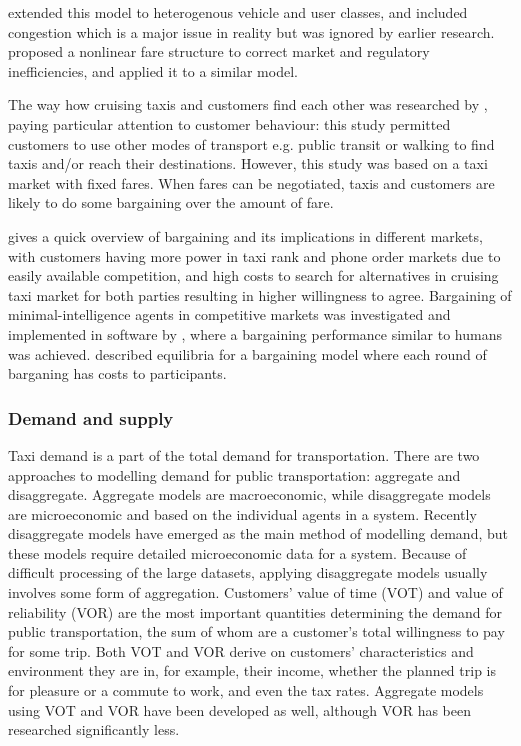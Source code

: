 \textcite{Wong2008taxi+modeling} extended this model to heterogenous vehicle
and user classes, and included congestion which is a major issue in reality but
was ignored by earlier research. \textcite{Yang2010taxi+nonlinear} proposed a
nonlinear fare structure to correct market and regulatory inefficiencies, and
applied it to a similar model.

The way how cruising taxis and customers find each other was researched by
\textcite{Yang2010taxi+equilibria}, paying particular attention to customer
behaviour: this study permitted customers to use other modes of transport e.g.
public transit or walking to find taxis and/or reach their destinations.
However, this study was based on a taxi market with fixed fares. When fares can
be negotiated, taxis and customers are likely to do some bargaining over the
amount of fare.

\textcite{Cairns1996taxi+competition} gives a quick overview of bargaining and
its implications in different markets, with customers having more power in taxi
rank and phone order markets due to easily available competition, and high
costs to search for alternatives in cruising taxi market for both parties
resulting in higher willingness to agree. Bargaining of minimal-intelligence
agents in competitive markets was investigated and implemented in software by
\textcite{Cli1997taxi+bargaining}, where a bargaining performance similar to
humans was achieved. \textcite{Rubinstein1982taxi+bargaining} described
equilibria for a bargaining model where each round of barganing has costs to
participants.


\subsubsection{Demand and supply}
\label{sec:literature:taxis:demand}

Taxi demand is a part of the total demand for transportation. There are two
approaches to modelling demand for public transportation: aggregate and
disaggregate. Aggregate models are macroeconomic, while disaggregate models are
microeconomic and based on the individual agents in a system. Recently
disaggregate models have emerged as the main method of modelling demand, but
these models require detailed microeconomic data for a system. Because of
difficult processing of the large datasets, applying disaggregate models
usually involves some form of aggregation. Customers' value of time (VOT) and
value of reliability (VOR) are the most important quantities determining the
demand for public transportation, the sum of whom are a customer's total
willingness to pay for some trip. Both VOT and VOR derive on customers'
characteristics and environment they are in, for example, their income, whether
the planned trip is for pleasure or a commute to work, and even the tax rates.
Aggregate models using VOT and VOR have been developed as well, although VOR
has been researched significantly less. \parencite{Small2007taxi+urban}

